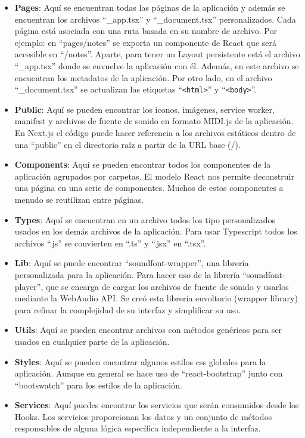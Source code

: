 \documentclass[12pt,twoside,titlepage]{report}
\begin{document}
\begin{itemize}
    \item \textbf{Pages}: Aquí se encuentran todas las páginas de la aplicación y además se encuentran los archivos ``\_app.tsx'' y ``\_document.tsx'' personalizados. Cada página está asociada con una ruta basada en su nombre de archivo. Por ejemplo: en ``pages/notes'' se exporta un componente de React que será accesible en ``/notes''.
    Aparte, para tener un Layout persistente está el archivo ``\_app.tsx'' donde se envuelve la aplicación con él. Además, en este archivo se encuentran los metadatos de la aplicación. Por otro lado, en el archivo ``\_document.tsx'' se actualizan las etiquetas ``\texttt{<html>}'' y ``\texttt{<body>}''.
    \item \textbf{Public}: Aquí se pueden encontrar los iconos, imágenes, service worker, manifest y archivos de fuente de sonido en formato MIDI.js de la aplicación. En Next.js el código puede hacer referencia a los archivos estáticos dentro de una ``public'' en el directorio raíz a partir de la URL base (/).
    \item \textbf{Components}: Aquí se pueden encontrar todos los componentes de la aplicación agrupados por carpetas. El modelo React nos permite deconstruir una página en una serie de componentes. Muchos de estos componentes a menudo se reutilizan entre páginas.
    \item \textbf{Types}: Aquí se encuentran en un archivo todos los tipo personalizados usados en los demás archivos de la aplicación. Para usar Typescript todos los archivos ``.js'' se convierten en ``.ts'' y ``.jsx'' en ``.tsx''.
    \item \textbf{Lib}: Aquí se puede encontrar ``soundfont-wrapper'', una librería personalizada para la aplicación. Para hacer uso de la librería ``soundfont-player'', que se encarga de cargar los archivos de fuente de sonido y usarlos mediante la WebAudio API. Se creó esta librería envoltorio (wrapper library) para refinar la complejidad de su interfaz y simplificar su uso.
    \item \textbf{Utils}: Aquí se pueden encontrar archivos con métodos genéricos para ser usados en cualquier parte de la aplicación.
    \item \textbf{Styles}: Aquí se pueden encontrar algunos estilos css globales para la aplicación. Aunque en general se hace uso de ``react-bootstrap'' junto con ``bootswatch'' para los estilos de la aplicación.
    \item \textbf{Services}: Aquí puedes encontrar los servicios que serán consumidos desde los Hooks. Los servicios proporcionan los datos y un conjunto de métodos responsables de alguna lógica específica independiente a la interfaz.

\end{itemize}
\end{document}
